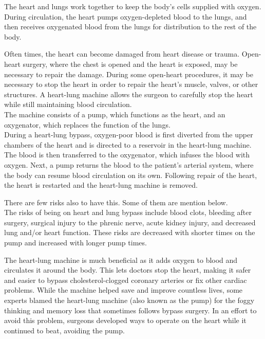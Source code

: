 \documentclass[12pt]{article}
\begin{document}
\indent

The heart and lungs work together to keep the body's cells supplied with oxygen. During circulation, the heart pumps oxygen-depleted blood to the lungs, and then receives oxygenated blood from the lungs for distribution to the rest of the body.

Often times, the heart can become damaged from heart disease or trauma. Open-heart surgery, where the chest is opened and the heart is exposed, may be necessary to repair the damage. During some open-heart procedures, it may be necessary to stop the heart in order to repair the heart's muscle, valves, or other structures. A heart-lung machine allows the surgeon to carefully stop the heart while still maintaining blood circulation.
\\

The machine consists of a pump, which functions as the heart, and an oxygenator, which replaces the function of the lungs.
\\
During a heart-lung bypass, oxygen-poor blood is first diverted from the upper chambers of the heart and is directed to a reservoir in the heart-lung machine. The blood is then transferred to the oxygenator, which infuses the blood with oxygen. Next, a pump returns the blood to the patient's arterial system, where the body can resume blood circulation on its own. Following repair of the heart, the heart is restarted and the heart-lung machine is removed.

\indent

There are few risks also to have this. Some of them are mention below.
\\
The risks of being on heart and lung bypass include blood clots, bleeding after surgery, surgical injury to the phrenic nerve, acute kidney injury, and decreased lung and/or heart function. These risks are decreased with shorter times on the pump and increased with longer pump times.

\indent

The heart-lung machine is much beneficial as it adds oxygen to blood and circulates it around the body. This lets doctors stop the heart, making it safer and easier to bypass cholesterol-clogged coronary arteries or fix other cardiac problems. While the machine helped save and improve countless lives, some experts blamed the heart-lung machine (also known as the pump) for the foggy thinking and memory loss that sometimes follows bypass surgery. In an effort to avoid this problem, surgeons developed ways to operate on the heart while it continued to beat, avoiding the pump.
\end{document}
